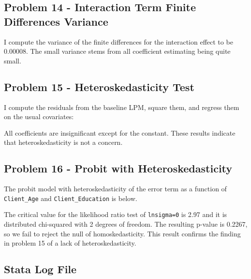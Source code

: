 \documentclass{article}
\begin{document}
\subsection*{Problem 14 - Interaction Term Finite Differences Variance}

I compute the variance of the finite differences for the interaction effect to be 0.00008.  The small variance stems from all coefficient estimating being quite small.

\pagebreak

\subsection*{Problem 15 - Heteroskedasticity Test}

I compute the residuals from the baseline LPM, square them, and regress them on the usual covariates:

\bigskip

\begin{center}

\end{center}

\bigskip

All coefficients are insignificant except for the constant.  These results indicate that heteroskedasticity is not a concern.

\pagebreak

\subsection*{Problem 16 - Probit with Heteroskedasticity}

The probit model with heteroskedasticity of the error term as a function of \texttt{Client\_Age} and \texttt{Client\_Education} is below.

\bigskip

\begin{center}

\end{center}

\bigskip

The critical value for the likelihood ratio test of \texttt{lnsigma=0} is 2.97 and it is distributed chi-squared with 2 degrees of freedom.  The resulting p-value is 0.2267, so we fail to reject the null of homoskedasticity.  This result confirms the finding in problem 15 of a lack of heteroskedasticity.

\pagebreak

\begin{landscape}

\section{Stata Log File}



\end{landscape}
\end{document}
